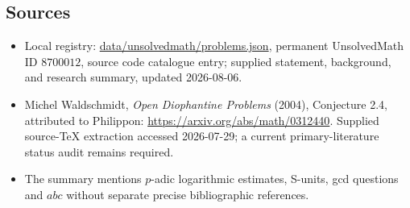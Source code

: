 \documentclass[11pt]{article}
\begin{document}
\subsection{Sources}
\begin{itemize}
\item Local registry: \url{data/unsolvedmath/problems.json}, permanent UnsolvedMath ID \(8700012\), source code catalogue entry; supplied statement, background, and research summary, updated 2026-08-06.
\item Michel Waldschmidt, \emph{Open Diophantine Problems} (2004), Conjecture 2.4, attributed to Philippon: \url{https://arxiv.org/abs/math/0312440}. Supplied source-TeX extraction accessed 2026-07-29; a current primary-literature status audit remains required.
\item The summary mentions \(p\)-adic logarithmic estimates, S-units, gcd questions and \(abc\) without separate precise bibliographic references.
\end{itemize}
\end{document}
